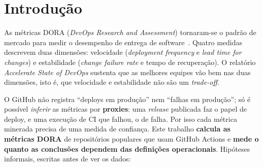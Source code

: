 \section{Introdução}

As métricas DORA (\textit{DevOps Research and Assessment}) tornaram-se o padrão de mercado para medir o
desempenho de entrega de software~\cite{forsgren2018accelerate}. Quatro medidas descrevem duas dimensões:
velocidade (\textit{deployment frequency} e \textit{lead time for changes}) e estabilidade (\textit{change failure
rate} e tempo de recuperação). O relatório \textit{Accelerate State of DevOps} sustenta que as melhores equipes
vão bem nas duas dimensões, isto é, que velocidade e estabilidade não são um \textit{trade-off}.

O GitHub não registra ``deploys em produção'' nem ``falhas em produção''; só é possível \emph{inferir} as métricas
por \textbf{proxies}: uma \textit{release} publicada faz o papel de deploy, e uma execução de CI que falhou, o de
falha. Por isso cada métrica minerada precisa de uma medida de confiança. Este trabalho \textbf{calcula as métricas DORA} de repositórios populares que usam GitHub Actions e
\textbf{mede o quanto as conclusões dependem das definições operacionais}. Hipóteses informais, escritas antes
de ver os dados:

